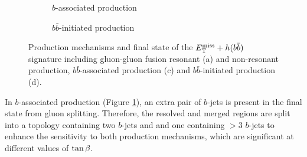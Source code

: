 \begin{figure}[h!]
\begin{subfigure}[b]{0.49\textwidth}
        \caption{$b$-associated production}
        \label{subfig:hbb-bb-associated}
    \end{subfigure}
    \begin{subfigure}[b]{0.49\textwidth}
        \centering
        \vspace{1.0cm}
        \caption{$b\bar{b}$-initiated production}
        \label{subfig:hbb-bb-initiated}
    \end{subfigure}
    \caption{Production mechanisms and final state of the $E_{\mathrm{T}}^{\mathrm{miss}}+h(b\bar{b})$ signature including gluon-gluon fusion resonant (a) and non-resonant production, $b\bar{b}$-associated production (c) and $b\bar{b}$-initiated production (d).}
    \label{fig:hbb-signature}
\end{figure} 

In $b$-associated production (Figure \ref{subfig:hbb-bb-associated}), an extra pair of $b$-jets is present in the final state from gluon splitting. Therefore, the resolved and merged regions are split into a topology containing two $b$-jets and and one containing $>3$ $b$-jets to enhance the sensitivity to both production mechanisms, which are significant at different values of $\tan\beta$.

